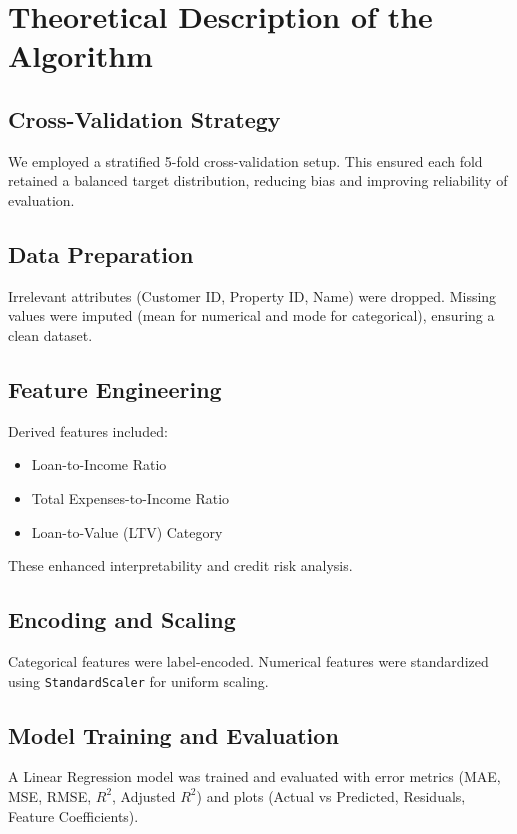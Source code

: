 \documentclass[11pt]{article}
\begin{document}
\section*{Theoretical Description of the Algorithm}

\subsection*{Cross-Validation Strategy}
We employed a stratified 5-fold cross-validation setup. This ensured each fold retained a balanced target distribution, reducing bias and improving reliability of evaluation.

\subsection*{Data Preparation}
Irrelevant attributes (Customer ID, Property ID, Name) were dropped. Missing values were imputed (mean for numerical and mode for categorical), ensuring a clean dataset.

\subsection*{Feature Engineering}
Derived features included:
\begin{itemize}
    \item Loan-to-Income Ratio
    \item Total Expenses-to-Income Ratio
    \item Loan-to-Value (LTV) Category
\end{itemize}
These enhanced interpretability and credit risk analysis.

\subsection*{Encoding and Scaling}
Categorical features were label-encoded. Numerical features were standardized using \texttt{StandardScaler} for uniform scaling.

\subsection*{Model Training and Evaluation}
A Linear Regression model was trained and evaluated with error metrics (MAE, MSE, RMSE, \(R^2\), Adjusted \(R^2\)) and plots (Actual vs Predicted, Residuals, Feature Coefficients).

\end{document}
